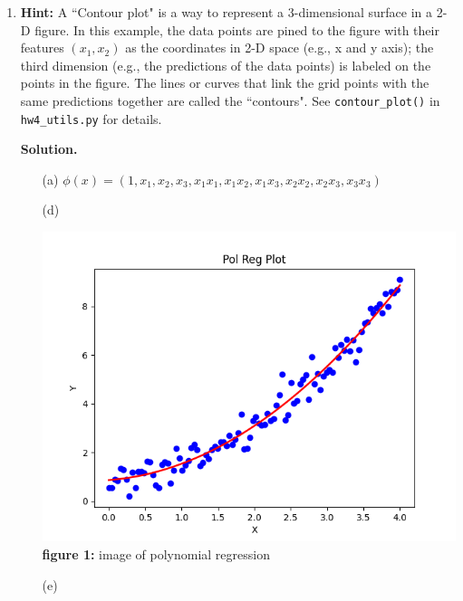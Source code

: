 \documentclass{article}
\theoremstyle{definition}
\theoremstyle{remark}
\newenvironment{Q}
{%
  \clearpage
  \item
  }
  {%
    \phantom{s} %
    \bigskip
    \textbf{Solution.}
  }
\begin{document}
\begin{enumerate}[font={\Large\bfseries},left=0pt]
\begin{Q}
\begin{enumerate}
\textbf{Hint:} A ``Contour plot" is a way to represent a 3-dimensional surface in a 2-D figure. In this example, the data points are pined to the figure with their features $(x_1, x_2)$ as the coordinates in 2-D space (e.g., x and y axis); the third dimension (e.g., the predictions of the data points) is labeled on the points in the figure. The lines or curves that link the grid points with the same predictions together are called the ``contours". See \texttt{contour\_plot()} in \texttt{hw4\_utils.py} for details.
  \end{enumerate}
  \end{Q}
  \begin{enumerate}
    \item[(a)] $\phi(x) = (1, x_1, x_2, x_3, x_1x_1, x_1x_2, x_1x_3, x_2x_2, x_2x_3, x_3x_3)$
    \item[(d)] \begin{center}
      \includegraphics[scale=0.55]{poly_reg.png}\\
      \textbf{figure 1:} image of polynomial regression\\  
    \end{center}
    \item[(e)]
  \end{enumerate}

\end{enumerate}
\end{document}
